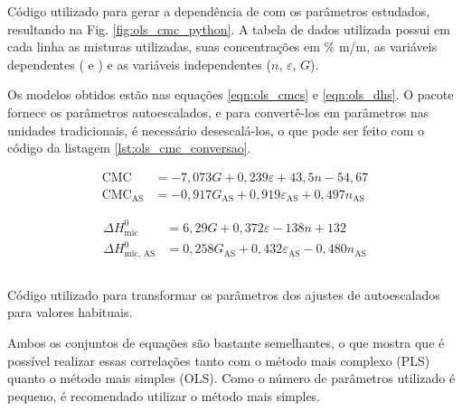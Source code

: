 		\begin{listing}[h]
			\inputminted{python}{./python/ols_cmc_statsmodels.py}
			\caption{Código utilizado para gerar a dependência de \cmc{} com os parâmetros estudados, resultando na Fig. \ref{fig:ols_cmc_python}. A tabela de dados utilizada possui em cada linha as misturas utilizadas, suas concentrações em \% m/m, as variáveis dependentes (\cmc{} e \DHmic) e as variáveis independentes (\(n\), \(\varepsilon\), \(G\)).}
			\label{lst:ols_cmc_python}
		\end{listing}
		
		Os modelos obtidos estão nas equações \ref{eqn:ols_cmcs} e \ref{eqn:ols_dhs}. O pacote fornece os parâmetros autoescalados, e para convertê-los em parâmetros nas unidades tradicionais, é necessário desescalá-los, o que pode ser feito com o código da listagem \ref{lst:ols_cmc_conversao}.
		
		\begin{subequations}
			\begin{align}
			\textrm{CMC}               & = -7,073G              + 0,239\varepsilon             + 43,5n              -54,67  \label{eqn:ols_cmc}     \\
			\textrm{CMC}_{\textrm{AS}} & = -0,917G_\textrm{AS}  + 0,919\varepsilon_\textrm{AS} +0,497n_\textrm{AS}          \label{eqn:ols_cmc_AS}
			\end{align}
			\label{eqn:ols_cmcs}
		\end{subequations}
		
		\begin{subequations}
			\begin{align}
			\Delta H_\textrm{mic}^0     & = 6,29G              + 0,372\varepsilon             - 138n               + 132  \label{eqn:ols_dh} \\
			\Delta H_\textrm{mic, AS}^0 & = 0,258G_\textrm{AS} + 0,432\varepsilon_\textrm{AS} - 0,480n_\textrm{AS}        \label{eqn:ols_dh_AS}
			\end{align}
			\label{eqn:ols_dhs}
		\end{subequations}
		
		\begin{listing}[h]
			\inputminted{python}{./python/ols_cmc_conversão.py}
			\caption{Código utilizado para transformar os parâmetros dos ajustes de autoescalados para valores habituais.}
			\label{lst:ols_cmc_conversao}
		\end{listing}
		
		Ambos os conjuntos de equações são bastante semelhantes, o que mostra que é possível realizar essas correlações tanto com o método mais complexo (PLS) quanto o método mais simples (OLS). Como o número de parâmetros utilizado é pequeno, é recomendado utilizar o método mais simples. %
		
